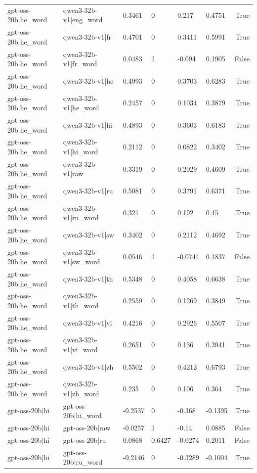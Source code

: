 \begin{table}
\begin{tabular}{llllllr}
gpt-oss-20b|he_word & qwen3-32b-v1|eng_word & 0.3461 & 0 & 0.217 & 0.4751 & True \\
gpt-oss-20b|he_word & qwen3-32b-v1|fr & 0.4701 & 0 & 0.3411 & 0.5991 & True \\
gpt-oss-20b|he_word & qwen3-32b-v1|fr_word & 0.0483 & 1 & -0.094 & 0.1905 & False \\
gpt-oss-20b|he_word & qwen3-32b-v1|he & 0.4993 & 0 & 0.3703 & 0.6283 & True \\
gpt-oss-20b|he_word & qwen3-32b-v1|he_word & 0.2457 & 0 & 0.1034 & 0.3879 & True \\
gpt-oss-20b|he_word & qwen3-32b-v1|hi & 0.4893 & 0 & 0.3603 & 0.6183 & True \\
gpt-oss-20b|he_word & qwen3-32b-v1|hi_word & 0.2112 & 0 & 0.0822 & 0.3402 & True \\
gpt-oss-20b|he_word & qwen3-32b-v1|raw & 0.3319 & 0 & 0.2029 & 0.4609 & True \\
gpt-oss-20b|he_word & qwen3-32b-v1|ru & 0.5081 & 0 & 0.3791 & 0.6371 & True \\
gpt-oss-20b|he_word & qwen3-32b-v1|ru_word & 0.321 & 0 & 0.192 & 0.45 & True \\
gpt-oss-20b|he_word & qwen3-32b-v1|sw & 0.3402 & 0 & 0.2112 & 0.4692 & True \\
gpt-oss-20b|he_word & qwen3-32b-v1|sw_word & 0.0546 & 1 & -0.0744 & 0.1837 & False \\
gpt-oss-20b|he_word & qwen3-32b-v1|th & 0.5348 & 0 & 0.4058 & 0.6638 & True \\
gpt-oss-20b|he_word & qwen3-32b-v1|th_word & 0.2559 & 0 & 0.1269 & 0.3849 & True \\
gpt-oss-20b|he_word & qwen3-32b-v1|vi & 0.4216 & 0 & 0.2926 & 0.5507 & True \\
gpt-oss-20b|he_word & qwen3-32b-v1|vi_word & 0.2651 & 0 & 0.136 & 0.3941 & True \\
gpt-oss-20b|he_word & qwen3-32b-v1|zh & 0.5502 & 0 & 0.4212 & 0.6793 & True \\
gpt-oss-20b|he_word & qwen3-32b-v1|zh_word & 0.235 & 0 & 0.106 & 0.364 & True \\
gpt-oss-20b|hi & gpt-oss-20b|hi_word & -0.2537 & 0 & -0.368 & -0.1395 & True \\
gpt-oss-20b|hi & gpt-oss-20b|raw & -0.0257 & 1 & -0.14 & 0.0885 & False \\
gpt-oss-20b|hi & gpt-oss-20b|ru & 0.0868 & 0.6427 & -0.0274 & 0.2011 & False \\
gpt-oss-20b|hi & gpt-oss-20b|ru_word & -0.2146 & 0 & -0.3289 & -0.1004 & True \\

\end{tabular}
\end{table}

